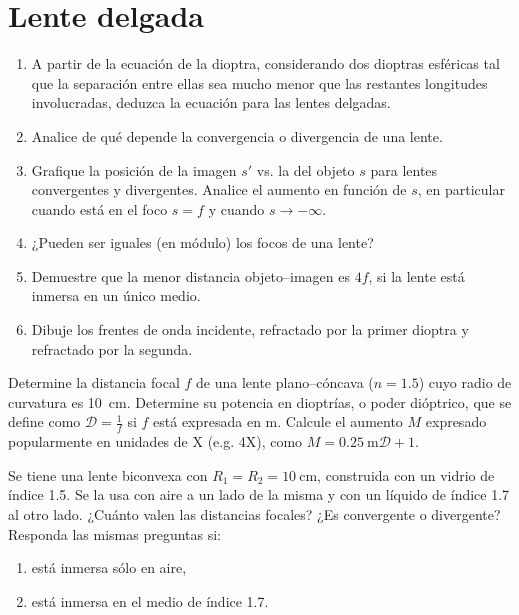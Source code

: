 \section*{Lente delgada}

\item 
\begin{enumerate}
	\item A partir de la ecuación de la dioptra, considerando dos dioptras esféricas tal que la separación entre ellas sea mucho menor que las restantes longitudes involucradas, deduzca la ecuación para las lentes delgadas.
	\item Analice de qué depende la convergencia o divergencia de una lente.
	\item Grafique la posición de la imagen $s'$ vs. la del objeto $s$ para lentes convergentes y divergentes.
	Analice el aumento en función de $s$, en particular cuando está en el foco \(s = f\) y cuando \(s \rightarrow - \infty\).
	\item ¿Pueden ser iguales (en módulo) los focos de una lente?
	\item Demuestre que la menor distancia objeto--imagen es $4f$, si la lente está inmersa en un único medio.
	\item Dibuje los frentes de onda incidente, refractado por la primer dioptra y refractado por la segunda.
\end{enumerate}



\item Determine la distancia focal \(f\) de una lente plano--cóncava (\(n = \num{1.5}\)) cuyo radio de curvatura es \SI{10}{\centi\metre}.
Determine su potencia en dioptrías, o poder dióptrico, que se define como \(\mathcal{D} = \frac{1}{f}\) si \(f\) está expresada en \si{\metre}.
Calcule el aumento \(M\) expresado popularmente en unidades de X (e.g. 4X), como \(M = \SI{0.25}{\metre} \mathcal{D} + 1\).



\item Se tiene una lente biconvexa con \(R_1 = R_2 = \SI{10}{\centi\metre}\), construida con un vidrio de índice \num{1.5}.
Se la usa con aire a un lado de la misma y con un líquido de índice \num{1.7} al otro lado.
¿Cuánto valen las distancias focales?
¿Es convergente o divergente?
Responda las mismas preguntas si:
\begin{enumerate}
	\item está inmersa sólo en aire,
	\item está inmersa en el medio de índice \num{1.7}.
\end{enumerate}



